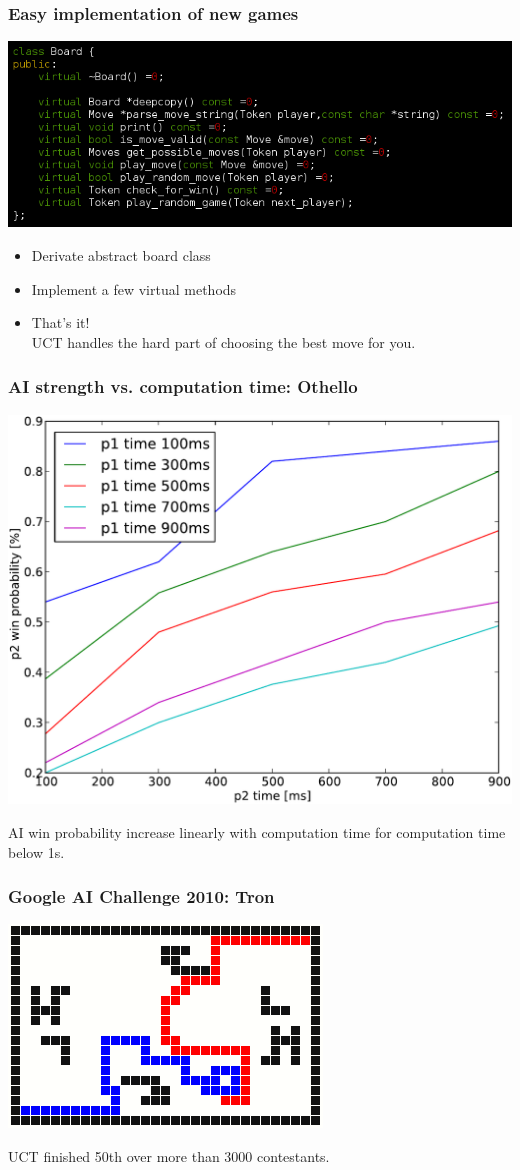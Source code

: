 \documentclass{beamer}
\begin{document}
\begin{frame}
\frametitle{Easy implementation of new games}
\begin{center}
\includegraphics[width=\linewidth]{board_virtual}
\end{center}
\begin{itemize}
\item Derivate abstract board class
\item Implement a few virtual methods
\item That's it! \\ UCT handles the hard part of choosing the best move for you.
\end{itemize}
\end{frame}

\begin{frame}
\frametitle{AI strength vs. computation time: Othello}
\begin{center}
\includegraphics[width=.6\linewidth]{perf_othello}
\end{center}
AI win probability increase linearly with computation time for computation time below 1s.
\end{frame}

\begin{frame}
\frametitle{Google AI Challenge 2010: Tron}
\begin{center}
\includegraphics[width=.7\linewidth]{tron} \\
\end{center}
UCT finished 50th over more than 3000 contestants.
\end{frame}
\end{document}
